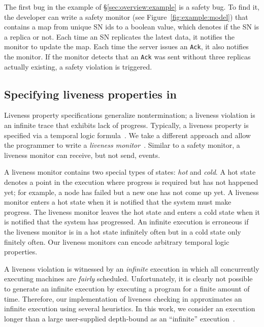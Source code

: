 The first bug in the example of \S\ref{sec:overview:example} is a safety bug. To find it, the developer can write a safety monitor (see Figure~\ref{fig:example:model}) that contains a map from unique SN ids to a boolean value, which denotes if the SN is a replica or not. Each time an SN replicates the latest data, it notifies the monitor to update the map. Each time the server issues an \texttt{Ack}, it also notifies the monitor. If the monitor detects that an \texttt{Ack} was sent without three replicas actually existing, a safety violation is triggered.

\vspace{-1mm}
\subsection{Specifying liveness properties in \psharp}
\label{sec:overview:liveness}

Liveness property specifications generalize nontermination; a liveness violation is an infinite trace that exhibits lack of progress. Typically, a liveness property is specified via a temporal logic formula~\cite{Pnueli1977, lamport1994temporal}. We take a different approach and allow the programmer to write a \emph{liveness monitor}~\cite{desai2015building}. Similar to a safety monitor, a liveness monitor can receive, but not send, events.

A liveness monitor contains two special types of states: \emph{hot} and \emph{cold}. A hot state denotes a point in the execution where progress is required but has not happened yet; for example, a node has failed but a new one has not come up yet. A liveness monitor enters a hot state when it is notified that the system must make progress. The liveness monitor leaves the hot state and enters a cold state when it is notified that the system has progressed. An infinite execution is erroneous if the liveness monitor is in a hot state infinitely often but in a cold state only finitely often. Our liveness monitors can encode arbitrary temporal logic properties.

A liveness violation is witnessed by an \emph{infinite} execution in which all concurrently executing \psharp machines are \emph{fairly} scheduled. Unfortunately, it is clearly not possible to generate an infinite execution by executing a program for a finite amount of time. Therefore, our implementation of liveness checking in \psharp approximates an infinite execution using several heuristics. In this work, we consider an execution longer than a large user-supplied depth-bound as an ``infinite'' execution~\cite{killian2007life, musuvathi2008fair}.

